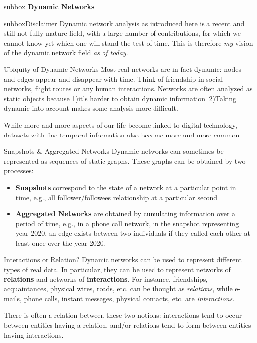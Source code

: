 \begin{subbox}{subbox}{}
    \centering
    \Large{\textbf{Dynamic Networks}}
\end{subbox}


\begin{subbox}{subbox}{Disclaimer}
    Dynamic network analysis as introduced here is a recent and still not fully mature field, with a large number of contributions, for which we cannot know yet which one will stand the test of time. This is therefore \textit{my} vision of the dynamic network field  \textit{as of today}.
\end{subbox}

\begin{textbox}{Ubiquity of Dynamic Networks}
    Most real networks are in fact dynamic: nodes and edges appear and disappear with time. Think of friendship in social networks, flight routes or any human interactions. Networks are often analyzed as static objects because 1)it's harder to obtain dynamic information, 2)Taking dynamic into account makes some analysis more difficult.

    While more and more aspects of our life become linked to digital technology, datasets with fine temporal information also become more and more common.
\end{textbox}

\begin{textbox}{Snapshots \& Aggregated Networks}
    Dynamic networks can sometimes be represented as sequences of static graphs.
    These graphs can be obtained by two processes:
    \begin{itemize}
        \item \textbf{Snapshots} correspond to the state of a network at a particular point in time, e.g., all follower/followees relationship at a particular second
        \item \textbf{Aggregated Networks} are obtained by cumulating information over a period of time, e.g., in a phone call network, in the snapshot representing year 2020, an edge exists between two individuals if they called each other at least once over the year 2020.
    \end{itemize}
\end{textbox}

\begin{textbox}{Interactions or Relation?}
    Dynamic networks can be used to represent different types of real data. In particular, they can be used to represent networks of \textbf{relations} and networks of \textbf{interactions}. For instance, friendships, acquaintances, physical wires, roads, etc. can be thought as \textit{relations}, while e-mails, phone calls, instant messages, physical contacts, etc. are \textit{interactions}.

    There is often a relation between these two notions: interactions tend to occur between entities having a relation, and/or relations tend to form between entities having interactions.
\end{textbox}


